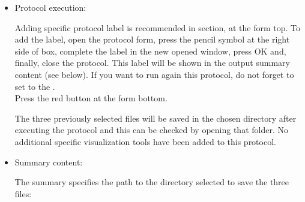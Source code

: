\begin{itemize}
  \item Protocol execution:
  
  Adding specific protocol label is recommended in  section, at the form top. To add the label, open the protocol form, press the pencil symbol at the right side of  box, complete the label in the new opened window, press OK and, finally, close the protocol. This label will be shown in the output summary content (see below). If you want to run again this protocol, do not forget to set to  the .\\
  Press the  red button at the form bottom.
  
  The three previously selected files will be saved in the chosen directory after executing the protocol and this can be checked by opening that folder. No additional specific visualization tools have been added to this protocol.

  \item Summary content:
  
   The summary specifies the path to the directory selected to save the three files:\\
    
\end{itemize}




